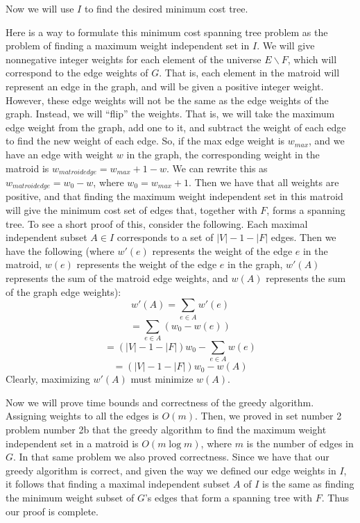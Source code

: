 \documentclass{article}
\begin{document}
\begin{description}
        \vspace{8mm}
        Now we will use $I$ to find the desired minimum cost tree.

         Here is a way to formulate this minimum cost spanning tree problem as the
        problem of finding a maximum weight independent set in $I$. We will
        give nonnegative integer
        weights for each element of the universe $E \backslash F$, which will correspond to the
        edge weights of $G$. That is, each element in the matroid will
        represent an edge in the graph, and will be given a positive integer weight.
        However, these edge weights will not be the
        same as the edge weights of the graph. Instead, we will ``flip'' the
        weights. That is, we will take the maximum edge weight from the graph,
        add one to it,
        and subtract the weight of each edge to find the new weight of each
        edge. So, if the max edge weight is $w_{max}$, and we have an edge with
        weight $w$ in the graph, the corresponding weight in the matroid is $w_{matroid edge} =
        w_{max} + 1 - w$. We can rewrite this as $w_{matroid edge} = w_0 - w$, where
        $w_0 = w_{max} + 1$.
        Then we have that all weights are positive,
        and that finding the maximum weight independent set in this
        matroid will give the minimum cost set of edges that, together with $F$,
        forms a spanning tree.
        To see a short proof of this, consider the
        following. Each maximal independent subset $A \in I$ corresponds to a set of
        $|V| - 1 - |F|$ edges. Then we have the following (where $w'(e)$
        represents the weight of the edge $e$ in the matroid, $w(e)$ represents the
        weight of the edge $e$ in the graph, $w'(A)$ represents the sum of the
        matroid edge weights, and $w(A)$ represents the sum of the graph edge
        weights):
        \[ w'(A) = \sum_{e \in A} w'(e) \]
        \[ = \sum_{e \in A} (w_0 - w(e)) \]
        \[ = (|V| - 1 - |F|)w_0 - \sum_{e \in A} w(e) \]
        \[ = (|V| - 1 - |F|)w_0 - w(A) \]
        Clearly, maximizing $w'(A)$ must minimize $w(A)$.

        Now we will prove time bounds and correctness of the greedy algorithm.
        Assigning weights to all the edges is $O(m)$. Then, we proved in set
        number 2 problem number 2b that the greedy algorithm to find the maximum weight
        independent set in a matroid is $O(m \log m)$, where $m$ is the number
        of edges in $G$. In that same problem we also proved correctness. Since
        we have that our greedy algorithm is correct, and given the way we
        defined our edge weights in $I$, it follows that finding a
        maximal independent subset $A$ of $I$ is the same as finding the minimum
        weight subset of $G$'s edges that form a spanning tree with $F$.
        Thus our proof is complete.
\end{description}
\newpage
\end{document}
